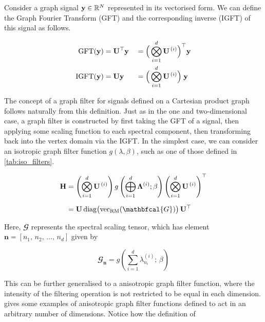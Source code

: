 Consider a graph signal $\mathbf{y} \in \mathbb{R}^N$ represented in its vectorised form. We can define the Graph Fourier Transform (GFT) and the corresponding inverse (IGFT) of this signal as follows. 

\begin{alignat}{2}
\label{eq:gft_nd}
    \text{GFT}(\mathbf{y}) & = \mathbf{U}^\top \mathbf{y} && = \Big(  \bigotimes_{i=1}^d  \mathbf{U}^{\,(i)} \Big)^\top \mathbf{y} \\
\label{eq:igft_nd}
    \text{IGFT}(\mathbf{y}) & = \mathbf{U} \mathbf{y} && = \Big(  \bigotimes_{i=1}^d  \mathbf{U}^{\,(i)} \Big) \; \mathbf{y} 
\end{alignat}

The concept of a graph filter for signals defined on a Cartesian product graph follows naturally from this definition. Just as in the one and two-dimensional case, a graph filter is constructed by first taking the GFT of a signal, then applying some scaling function to each spectral component, then transforming back into the vertex domain via the IGFT. In the simplest case, we can consider an isotropic graph filter function $g(\lambda, \beta)$, such as one of those defined in \cref{tab:iso_filters}. 


\begin{align}
    \HH &= \left( \bigotimes_{i=1}^d  \U^{\,(i)} \right) g\left(\bigoplus_{i=1}^d \LAM^{(i)}; \beta \right) \left(\bigotimes_{i=1}^d  \U^{\,(i)} \right)^\top \notag \\[0.2cm]
        &= \U \, \Diag{\vecrm{\mathbfcal{G}}} \, \U^\top
\end{align}


Here, $\mathbfcal{G}$ represents the spectral scaling tensor, which has element $\mathbf{n} = [n_1,\, n_2,\, ...,\, n_d]$ given by 

\begin{equation}
    \mathbfcal{G}_{\mathbf{n}} = g\left(\sum_{i=1}^d \lambda^{(i)}_{n_i}; \, \beta\right)
\end{equation}

This can be further generalised to a anisotropic graph filter function, where the intensity of the filtering operation is not restricted to be equal in each dimension.  gives some examples of anisotropic graph filter functions defined to act in an arbitrary number of dimensions. Notice how the definition of  

